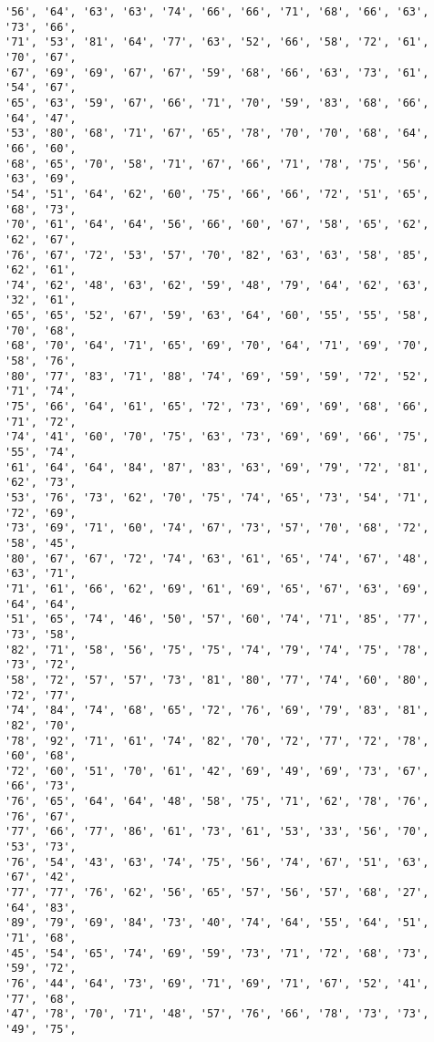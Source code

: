 \documentclass[11pt]{article}
\begin{document}
\begin{Verbatim}[commandchars=\\\{\}]
'56', '64', '63', '63', '74', '66', '66', '71', '68', '66', '63', '73', '66',
'71', '53', '81', '64', '77', '63', '52', '66', '58', '72', '61', '70', '67',
'67', '69', '69', '67', '67', '59', '68', '66', '63', '73', '61', '54', '67',
'65', '63', '59', '67', '66', '71', '70', '59', '83', '68', '66', '64', '47',
'53', '80', '68', '71', '67', '65', '78', '70', '70', '68', '64', '66', '60',
'68', '65', '70', '58', '71', '67', '66', '71', '78', '75', '56', '63', '69',
'54', '51', '64', '62', '60', '75', '66', '66', '72', '51', '65', '68', '73',
'70', '61', '64', '64', '56', '66', '60', '67', '58', '65', '62', '62', '67',
'76', '67', '72', '53', '57', '70', '82', '63', '63', '58', '85', '62', '61',
'74', '62', '48', '63', '62', '59', '48', '79', '64', '62', '63', '32', '61',
'65', '65', '52', '67', '59', '63', '64', '60', '55', '55', '58', '70', '68',
'68', '70', '64', '71', '65', '69', '70', '64', '71', '69', '70', '58', '76',
'80', '77', '83', '71', '88', '74', '69', '59', '59', '72', '52', '71', '74',
'75', '66', '64', '61', '65', '72', '73', '69', '69', '68', '66', '71', '72',
'74', '41', '60', '70', '75', '63', '73', '69', '69', '66', '75', '55', '74',
'61', '64', '64', '84', '87', '83', '63', '69', '79', '72', '81', '62', '73',
'53', '76', '73', '62', '70', '75', '74', '65', '73', '54', '71', '72', '69',
'73', '69', '71', '60', '74', '67', '73', '57', '70', '68', '72', '58', '45',
'80', '67', '67', '72', '74', '63', '61', '65', '74', '67', '48', '63', '71',
'71', '61', '66', '62', '69', '61', '69', '65', '67', '63', '69', '64', '64',
'51', '65', '74', '46', '50', '57', '60', '74', '71', '85', '77', '73', '58',
'82', '71', '58', '56', '75', '75', '74', '79', '74', '75', '78', '73', '72',
'58', '72', '57', '57', '73', '81', '80', '77', '74', '60', '80', '72', '77',
'74', '84', '74', '68', '65', '72', '76', '69', '79', '83', '81', '82', '70',
'78', '92', '71', '61', '74', '82', '70', '72', '77', '72', '78', '60', '68',
'72', '60', '51', '70', '61', '42', '69', '49', '69', '73', '67', '66', '73',
'76', '65', '64', '64', '48', '58', '75', '71', '62', '78', '76', '76', '67',
'77', '66', '77', '86', '61', '73', '61', '53', '33', '56', '70', '53', '73',
'76', '54', '43', '63', '74', '75', '56', '74', '67', '51', '63', '67', '42',
'77', '77', '76', '62', '56', '65', '57', '56', '57', '68', '27', '64', '83',
'89', '79', '69', '84', '73', '40', '74', '64', '55', '64', '51', '71', '68',
'45', '54', '65', '74', '69', '59', '73', '71', '72', '68', '73', '59', '72',
'76', '44', '64', '73', '69', '71', '69', '71', '67', '52', '41', '77', '68',
'47', '78', '70', '71', '48', '57', '76', '66', '78', '73', '73', '49', '75',

\end{Verbatim}
\end{document}
